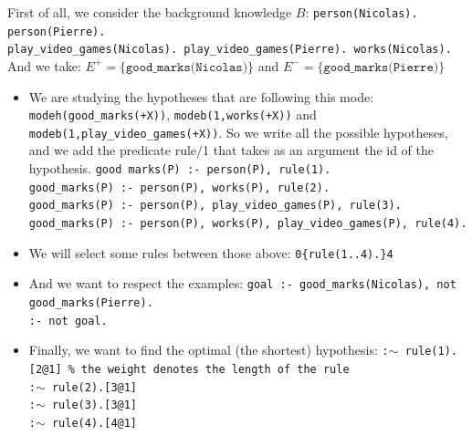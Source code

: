 First of all, we consider the background knowledge $B$:\newline
\texttt{person(Nicolas). person(Pierre).\\
play\_video\_games(Nicolas). play\_video\_games(Pierre). works(Nicolas).}\\

And we take: $E^+=\{\texttt{good\_marks(Nicolas)}\}$ and $E^-=\{\texttt{good\_marks(Pierre)}\}$

\begin{itemize}
\item We are studying the hypotheses that are following this mode: \texttt{modeh(good\_marks(+X))}, \texttt{modeb(1,works(+X))} and \texttt{modeb(1,play\_video\_games(+X))}. So we write all the possible hypotheses, and we add the predicate rule/1 that takes as an argument the id of the hypothesis.\newline
\texttt{good marks(P) :- person(P), rule(1).\\
good\_marks(P) :- person(P), works(P), rule(2).\\
good\_marks(P) :- person(P), play\_video\_games(P), rule(3).\\
good\_marks(P) :- person(P), works(P), play\_video\_games(P), rule(4).}

\item We will select some rules between those above:\newline
\texttt{0\{rule(1..4).\}4}

\item And we want to respect the examples:\newline
\texttt{goal :- good\_marks(Nicolas), not good\_marks(Pierre).\\
:- not goal.}

\item Finally, we want to find the optimal (the shortest) hypothesis:\newline
\texttt{:$\sim$ rule(1).[2@1] \% the weight denotes the length of the rule\\
:$\sim$ rule(2).[3@1]\\
:$\sim$ rule(3).[3@1]\\
:$\sim$ rule(4).[4@1]\\}
\end{itemize}

